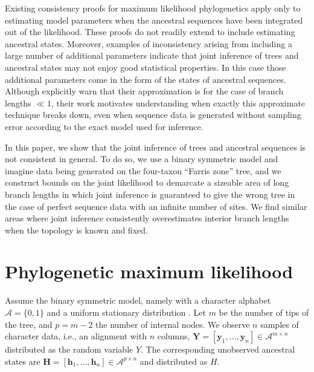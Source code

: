 \documentclass{article}
\newcommand{\alphabet}{\mathcal{A}}
\newcommand{\fullAlignment}{\mathbf{Y}}
\newcommand{\alignmentColumn}{\mathbf{y}}
\newcommand{\alignmentColumnRV}{Y}
\newcommand{\fullAncestralStates}{\mathbf{H}}
\newcommand{\ancestralStateColumn}{\mathbf{h}}
\newcommand{\ancestralStateColumnRV}{H}
\newcommand{\nCols}{n}
\newcommand{\nSiteRows}{m}
\newcommand{\nAncestralStateRows}{p}
\begin{document}
Existing consistency proofs for maximum likelihood phylogenetics \cite{RoyChoudhury2015-ta} apply only to estimating model parameters when the ancestral sequences have been integrated out of the likelihood.
These proofs do not readily extend to include estimating ancestral states.
Moreover, examples of inconsistency arising from including a large number of additional parameters \cite{Neyman1948-tt} indicate that joint inference of trees and ancestral states may not enjoy good statistical properties.
In this case those additional parameters come in the form of the states of ancestral sequences.
Although \cite{Sagulenko2017-jo} explicitly warn that their approximation is for the case of branch lengths $\ll 1$, their work motivates understanding when exactly this approximate technique breaks down, even when sequence data is generated without sampling error according to the exact model used for inference.

In this paper, we show that the joint inference of trees and ancestral sequences is not consistent in general.
To do so, we use a binary symmetric model and imagine data being generated on the four-taxon ``Farris zone'' \cite{Siddall1998-hq} tree, and we construct bounds on the joint likelihood to demarcate a sizeable area of long branch lengths in which joint inference is guaranteed to give the wrong tree in the case of perfect sequence data with an infinite number of sites.
We find similar areas where joint inference consistently overestimates interior branch lengths when the topology is known and fixed.

\section*{Phylogenetic maximum likelihood}

Assume the binary symmetric model, namely with a character alphabet $\alphabet=\{0,1\}$ and a uniform stationary distribution \cite{Semple2003-em}.
Let $\nSiteRows$ be the number of tips of the tree, and $\nAncestralStateRows = \nSiteRows-2$ the number of internal nodes.
We observe $\nCols$ samples of character data, i.e., an alignment with $\nCols$ columns, $\fullAlignment=[\alignmentColumn_1,\ldots,\alignmentColumn_\nCols]\in\alphabet^{\nSiteRows\times\nCols}$ distributed as the random variable $\alignmentColumnRV$.
The corresponding unobserved ancestral states are $\fullAncestralStates=[\ancestralStateColumn_1,\ldots,\ancestralStateColumn_\nCols]\in\alphabet^{\nAncestralStateRows\times\nCols}$ and distributed as $\ancestralStateColumnRV$.
\end{document}
